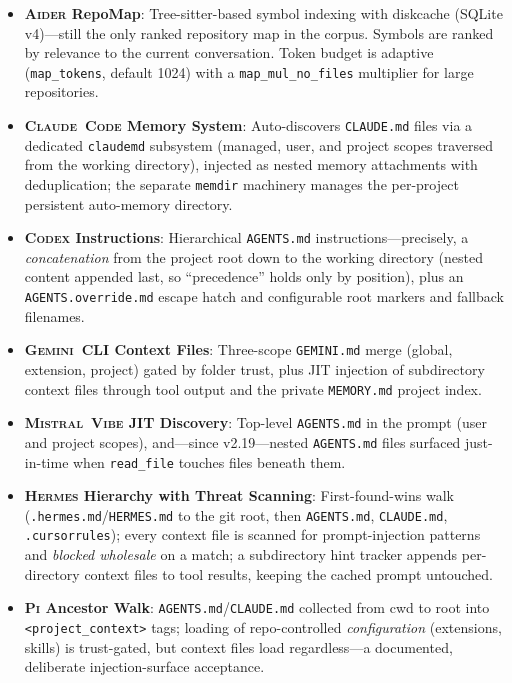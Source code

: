 \documentclass[11pt,a4paper]{article}
\newcommand{\clcode}{\textsc{Claude~Code}\xspace}
\newcommand{\cdx}{\textsc{Codex}\xspace}
\newcommand{\adr}{\textsc{Aider}\xspace}
\newcommand{\vibe}{\textsc{Mistral~Vibe}\xspace}
\newcommand{\gemini}{\textsc{Gemini~CLI}\xspace}
\newcommand{\hrm}{\textsc{Hermes}\xspace}
\newcommand{\pib}{\textsc{Pi}\xspace}
\begin{document}
\begin{itemize}[itemsep=1pt]
  \item \textbf{\adr{} RepoMap}: Tree-sitter-based symbol indexing with diskcache (SQLite v4)---still the only ranked repository map in the corpus.
  Symbols are ranked by relevance to the current conversation.
  Token budget is adaptive (\texttt{map\_tokens}, default 1024) with a \texttt{map\_mul\_no\_files} multiplier for large repositories.

  \item \textbf{\clcode{} Memory System}: Auto-discovers \texttt{CLAUDE.md} files via a dedicated \texttt{claudemd} subsystem (managed, user, and project scopes traversed from the working directory), injected as nested memory attachments with deduplication; the separate \texttt{memdir} machinery manages the per-project persistent auto-memory directory.

  \item \textbf{\cdx{} Instructions}: Hierarchical \texttt{AGENTS.md} instructions---precisely, a \emph{concatenation} from the project root down to the working directory (nested content appended last, so ``precedence'' holds only by position), plus an \texttt{AGENTS.override.md} escape hatch and configurable root markers and fallback filenames.

  \item \textbf{\gemini{} Context Files}: Three-scope \texttt{GEMINI.md} merge (global, extension, project) gated by folder trust, plus JIT injection of subdirectory context files through tool output and the private \texttt{MEMORY.md} project index.

  \item \textbf{\vibe{} JIT Discovery}: Top-level \texttt{AGENTS.md} in the prompt (user and project scopes), and---since v2.19---nested \texttt{AGENTS.md} files surfaced just-in-time when \texttt{read\_file} touches files beneath them.

  \item \textbf{\hrm{} Hierarchy with Threat Scanning}: First-found-wins walk (\texttt{.hermes.md}/\texttt{HERMES.md} to the git root, then \texttt{AGENTS.md}, \texttt{CLAUDE.md}, \texttt{.cursorrules}); every context file is scanned for prompt-injection patterns and \emph{blocked wholesale} on a match; a subdirectory hint tracker appends per-directory context files to tool results, keeping the cached prompt untouched.

  \item \textbf{\pib{} Ancestor Walk}: \texttt{AGENTS.md}/\texttt{CLAUDE.md} collected from cwd to root into \texttt{<project\_context>} tags; loading of repo-controlled \emph{configuration} (extensions, skills) is trust-gated, but context files load regardless---a documented, deliberate injection-surface acceptance.


\end{itemize}
\end{document}
